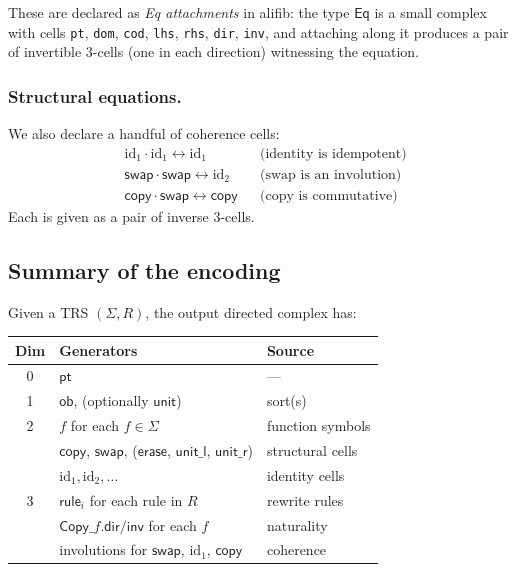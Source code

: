 \documentclass[acmsmall,screen,nonacm]{acmart}
\newcommand{\ob}{\mathsf{ob}}
\newcommand{\unit}{\mathsf{unit}}
\newcommand{\id}{\mathrm{id}}
\newcommand{\copy}{\mathsf{copy}}
\newcommand{\swap}{\mathsf{swap}}
\newcommand{\erase}{\mathsf{erase}}
\newcommand{\alifib}{\textsf{alifib}}
\begin{document}
These are declared as \emph{Eq attachments} in \alifib{}: the type
$\mathsf{Eq}$ is a small complex with cells \texttt{pt}, \texttt{dom},
\texttt{cod}, \texttt{lhs}, \texttt{rhs}, \texttt{dir}, \texttt{inv},
and attaching along it produces a pair of invertible $3$-cells
(one in each direction) witnessing the equation.

\subsubsection{Structural equations.}
We also declare a handful of coherence cells:
\begin{align*}
  &\id_1 \cdot \id_1 \leftrightarrow \id_1
    &&\text{(identity is idempotent)} \\
  &\swap \cdot \swap \leftrightarrow \id_2
    &&\text{(swap is an involution)} \\
  &\copy \cdot \swap \leftrightarrow \copy
    &&\text{(copy is commutative)}
\end{align*}
Each is given as a pair of inverse $3$-cells.

\subsection{Summary of the encoding}
\label{sec:summary}

Given a TRS $(\Sigma, R)$, the output directed complex has:

\begin{center}
\begin{tabular}{cll}
\textbf{Dim} & \textbf{Generators} & \textbf{Source} \\
\hline
0 & $\mathsf{pt}$ & --- \\
1 & $\ob$, (optionally $\unit$) & sort(s) \\
2 & $f$ for each $f \in \Sigma$ & function symbols \\
  & $\copy$, $\swap$, ($\erase$, $\mathsf{unit\_l}$,
    $\mathsf{unit\_r}$) & structural cells \\
  & $\id_1, \id_2, \ldots$ & identity cells \\
3 & $\mathsf{rule}_i$ for each rule in $R$ & rewrite rules \\
  & $\mathsf{Copy\_}f.\mathsf{dir}/\mathsf{inv}$ for each $f$ & naturality \\
  & involutions for $\swap$, $\id_1$, $\copy$ & coherence
\end{tabular}
\end{center}
\end{document}
